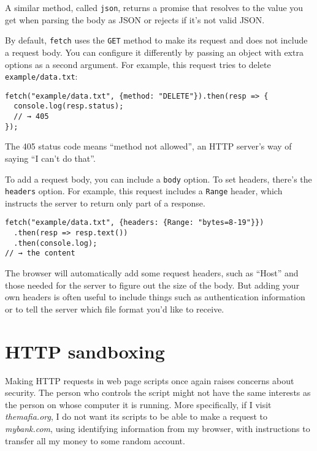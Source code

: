A similar method, called \lstinline`json`, returns a promise that resolves to the value you get when parsing the body as JSON or rejects if it's not valid JSON.

By default, \lstinline`fetch` uses the \lstinline`GET` method to make its request and does not include a request body. You can configure it differently by passing an object with extra options as a second argument. For example, this request tries to delete \lstinline`example/data.txt`:

\begin{lstlisting}
fetch("example/data.txt", {method: "DELETE"}).then(resp => {
  console.log(resp.status);
  // → 405
});
\end{lstlisting}
\noindent{}

The 405 status code means ``method not allowed'', an HTTP server's way of saying ``I can't do that''.

To add a request body, you can include a \lstinline`body` option. To set headers, there's the \lstinline`headers` option. For example, this request includes a \lstinline`Range` header, which instructs the server to return only part of a response.

\begin{lstlisting}
fetch("example/data.txt", {headers: {Range: "bytes=8-19"}})
  .then(resp => resp.text())
  .then(console.log);
// → the content
\end{lstlisting}
\noindent

The browser will automatically add some request headers, such as ``Host'' and those needed for the server to figure out the size of the body. But adding your own headers is often useful to include things such as authentication information or to tell the server which file format you'd like to receive.

\label{http.http_sandbox}\section{HTTP sandboxing}

Making HTTP requests in web page scripts once again raises concerns about security. The person who controls the script might not have the same interests as the person on whose computer it is running. More specifically, if I visit \emph{themafia.org}, I do not want its scripts to be able to make a request to \emph{mybank.com}, using identifying information from my browser, with instructions to transfer all my money to some random account.

